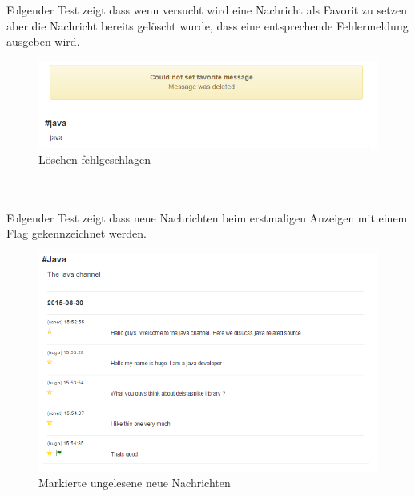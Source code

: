 \documentclass[11pt, a4paper, twoside]{article}   	%
\begin{document}
Folgender Test zeigt dass wenn versucht wird eine Nachricht als Favorit zu setzen aber die Nachricht bereits gelöscht wurde, dass eine entsprechende Fehlermeldung ausgeben wird.
\begin{figure}[h]
	\centering
	\includegraphics[scale=0.5]{images/start_channel_chat_set_favorite_fail.PNG}
	\caption
	{Löschen fehlgeschlagen}
\end{figure}\\\\

Folgender Test zeigt dass neue Nachrichten beim erstmaligen Anzeigen mit einem Flag gekennzeichnet werden.
\begin{figure}[h]
	\centering
	\includegraphics[scale=0.5]{images/start_channel_chat_marked_unread.PNG}
	\caption
	{Markierte ungelesene neue Nachrichten}
\end{figure}\\\\
\newpage
\end{document}
